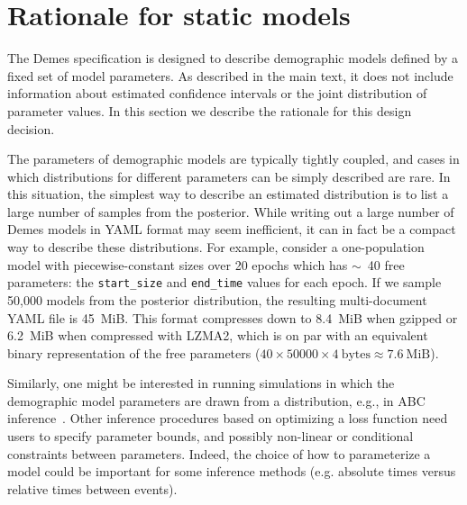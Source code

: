 \documentclass[11pt]{article}
\newcommand{\ggcomment}[1]{{\textcolor{yellow!60!red}{GG: #1}}}
\begin{document}
\section{Rationale for static models}
\label{sec:appendix-static}

The Demes specification is designed to describe demographic
models defined by a fixed set of model parameters.
As described in the main text, it does not include
information about estimated confidence intervals or the joint distribution
of parameter values. In this section we describe the rationale
for this design decision.

The parameters of
demographic models are typically tightly coupled, and cases in which
distributions for different parameters can be simply described are rare.
In this situation, the simplest way to describe an estimated
distribution is to list a large number of samples from
the posterior. While writing out a large number of Demes models in
YAML format may seem inefficient, it can in fact be a compact
way to describe these distributions.
For example, consider a one-population model with piecewise-constant sizes over
20 epochs which has $\sim$~40 free parameters: the \texttt{start\_size} and
\texttt{end\_time} values for each epoch. If we sample 50,000 models
from the posterior distribution, the resulting multi-document YAML file is
45~MiB.
This format compresses down to 8.4~MiB when gzipped or 6.2~MiB
when compressed with LZMA2, which is on par with an equivalent binary
representation of the free parameters
($40\times50000\times4~\text{bytes} \approx 7.6~\text{MiB}$).

Similarly, one might be interested in running simulations in which
the demographic model parameters are drawn from a distribution, e.g.,
in ABC inference~\citep{beaumont2002approximate}.
Other inference procedures based on optimizing a loss function
\citep{gutenkunst2009inferring,kamm2017efficient,jouganous2017inferring,ragsdale2019models,excoffier2021fastsimcoal2}
need users to specify parameter bounds,
and possibly non-linear or conditional constraints between parameters.
Indeed, the choice of how to parameterize a model could be important for
some inference methods (e.g. absolute times versus relative times between events).
\end{document}
